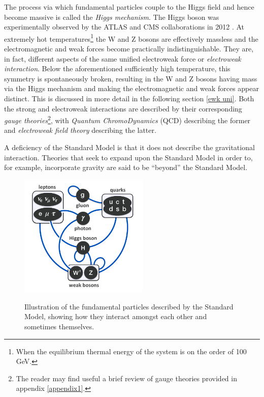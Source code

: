 The process via which fundamental particles couple to the Higgs field and hence become massive is called the \emph{Higgs mechanism}. The Higgs boson was experimentally observed by the ATLAS and CMS collaborations in 2012 \cite{ATLAS_higgs,CMS_higgs}. At extremely hot temperatures\footnote{When the equilibrium thermal energy of the system is on the order of 100 GeV.} the W and Z bosons are effectively massless and the electromagnetic and weak forces become practically indistinguishable. They are, in fact, different aspects of the same unified electroweak force or \emph{electroweak interaction}. Below the aforementioned sufficiently high temperature, this symmetry is spontaneously broken, resulting in the W and Z bosons having mass via the Higgs mechanism and making the electromagnetic and weak forces appear distinct. This is discussed in more detail in the following section \ref{ewk uni}. Both the strong and electroweak interactions are described by their corresponding \emph{gauge theories}\footnote{The reader may find useful a brief review of gauge theories provided in appendix \ref{appendix1}.}, with \emph{Quantum ChromoDynamics} (QCD) describing the former and \emph{electroweak field theory} describing the latter.

A deficiency of the Standard Model is that it does not describe the gravitational interaction. Theories that seek to expand upon the Standard Model in order to, for example, incorporate gravity are said to be ``beyond'' the Standard Model.
\begin{figure}
\centering
\includegraphics[width=0.55\textwidth]{images/fund_part_in_sm.png}
\label{sm_part_image}
\caption{Illustration of the fundamental particles described by the Standard Model, showing how they interact amongst each other and sometimes themselves. \cite{fund_part_image}}
\end{figure}

